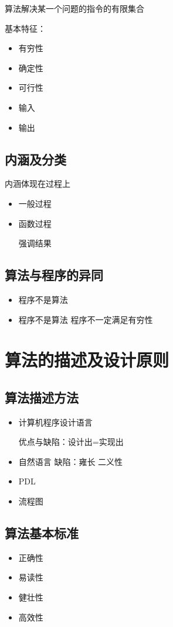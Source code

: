 \documentclass[AutoFakeBold]{LZUThesis2007}
\begin{document}
			算法解决某一个问题的指令的有限集合

			基本特征：
				\begin{itemize}
					\item 有穷性
					\item 确定性
					\item 可行性
					\item 输入
					\item 输出
				\end{itemize}

		\subsection{内涵及分类}
			内涵体现在过程上
				\begin{itemize}
					\item 一般过程
					\item 函数过程

						强调结果

				\end{itemize}

		\subsection{算法与程序的异同}
				\begin{itemize}
					\item 程序不是算法
					\item 程序不是算法 程序不一定满足有穷性
				\end{itemize}

	\section{算法的描述及设计原则}
		\subsection{算法描述方法}
			\begin{itemize}
				\item 计算机程序设计语言

					优点与缺陷：设计出=实现出

				\item 自然语言
					缺陷：雍长 二义性
				\item PDL
				\item 流程图
			\end{itemize}

		\subsection{算法基本标准}
			\begin{itemize}
				\item 正确性
				\item 易读性
				\item 健壮性
				\item 高效性
			\end{itemize}
\end{document}
